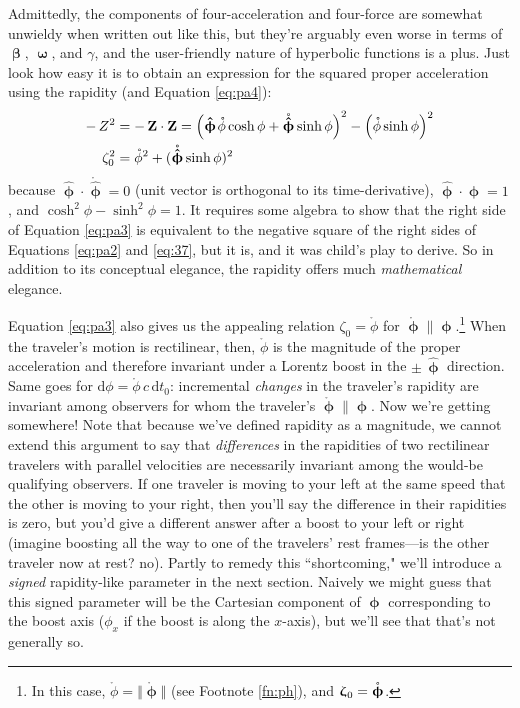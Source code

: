 \documentclass[12pt]{article}
\renewcommand{\vv}[1]{\mathbf{#1}}
\newcommand{\dd}[1]{\mathrm{d}#1}
\newcommand{\vvbeta}{\bm{\upbeta}}
\newcommand{\vvomega}{\bm{\upomega}}
\newcommand{\vvphi}{\bm{\upphi}}
\newcommand{\hatphi}{\bm{\hat{\upphi}}}
\newcommand{\vvzeta}{\bm{\upzeta}}
\begin{document}
Admittedly, the components of four-acceleration and four-force are somewhat unwieldy when written out like this, but they're arguably even worse in terms of $\vvbeta$, $\vvomega$, and $\gamma$, and the user-friendly nature of hyperbolic functions is a plus. Just look how easy it is to obtain an expression for the squared proper acceleration using the rapidity (and Equation \ref{eq:pa4}):
\begin{equation}\label{eq:pa3}
\begin{split}
- \, Z^2 &= - \, \vv Z \cdot \vv Z = \left( \hatphi \mkern1.5mu \mathring{\phi} \cosh{\phi} + \mathring{\hatphi} \sinh{\phi} \right)^2 - \left( \mathring{\phi} \sinh{\phi} \right)^2 \\
\zeta_0^2 &= \mathring{\phi}^2 + (\mathring{\hatphi} \sinh{\phi})^2 
\end{split}
\end{equation}
because $\hatphi \cdot \mathring{\hatphi} = 0$ (unit vector is orthogonal to its time-derivative), $\hatphi \cdot \hatphi = 1$, and $\cosh^{2}{\phi} - \sinh^{2}{\phi} = 1$. It requires some algebra to show that the right side of Equation \ref{eq:pa3} is equivalent to the negative square of the right sides of Equations \ref{eq:pa2} and \ref{eq:37}, but it is, and it was child's play to derive. So in addition to its conceptual elegance, the rapidity offers much \emph{mathematical} elegance.

Equation \ref{eq:pa3} also gives us the appealing relation $\zeta_0 = \mathring{\phi}$ for $\mathring{\vvphi} \parallel \vvphi$.\footnote{In this case, $\mathring{\phi} = \Vert \mathring{\vvphi} \Vert$ (see Footnote \ref{fn:ph}), and $\vvzeta_{\mkern1mu 0} = \mathring{\vvphi}$.} When the traveler's motion is rectilinear, then, $\mathring{\phi}$ is the magnitude of the proper acceleration and therefore invariant under a Lorentz boost in the $\pm \, \hatphi$ direction. Same goes for $\dd \phi = \mathring{\phi} \, c \, \dd t_0$: incremental \emph{changes} in the traveler's rapidity are invariant among observers for whom the traveler's $\mathring{\vvphi} \parallel \vvphi$. Now we're getting somewhere! Note that because we've defined rapidity as a magnitude, we cannot extend this argument to say that \emph{differences} in the rapidities of two rectilinear travelers with parallel velocities are necessarily invariant among the would-be qualifying observers. If one traveler is moving to your left at the same speed that the other is moving to your right, then you'll say the difference in their rapidities is zero, but you'd give a different answer after a boost to your left or right (imagine boosting all the way to one of the travelers' rest frames---is the other traveler now at rest? no). Partly to remedy this ``shortcoming," we'll introduce a \emph{signed} rapidity-like parameter in the next section. Naively we might guess that this signed parameter will be the Cartesian component of $\vvphi$ corresponding to the boost axis ($\phi_x$ if the boost is along the $x$-axis), but we'll see that that's not generally so.
\end{document}
